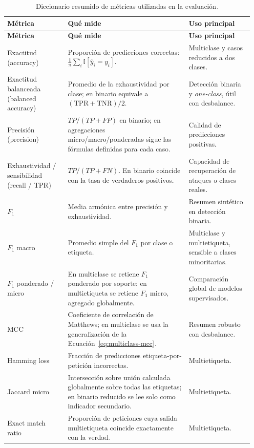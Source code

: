 \documentclass[12pt,oneside]{report}
\newcommand{\ind}{\mathbb{I}} %
\begin{document}
\begin{longtable}{@{}L{0.24\textwidth}L{0.43\textwidth}L{0.25\textwidth}@{}}
\caption{Diccionario resumido de métricas utilizadas en la evaluación.}\label{tab:diccionario-metricas}\\
\toprule
\textbf{Métrica} & \textbf{Qué mide} & \textbf{Uso principal} \\
\midrule
\endfirsthead
\toprule
\textbf{Métrica} & \textbf{Qué mide} & \textbf{Uso principal} \\
\midrule
\endhead
Exactitud (accuracy) & Proporción de predicciones correctas: $\frac{1}{n}\sum_i \ind[\hat y_i=y_i]$. & Multiclase y casos reducidos a dos clases. \\
Exactitud balanceada (balanced accuracy) & Promedio de la exhaustividad por clase; en binario equivale a $(\mathrm{TPR}+\mathrm{TNR})/2$. & Detección binaria y \textit{one-class}, útil con desbalance. \\
Precisión (precision) & $TP/(TP+FP)$ en binario; en agregaciones micro/macro/ponderadas sigue las fórmulas definidas para cada caso. & Calidad de predicciones positivas. \\
Exhaustividad / sensibilidad (recall / TPR) & $TP/(TP+FN)$. En binario coincide con la tasa de verdaderos positivos. & Capacidad de recuperación de ataques o clases reales. \\
$F_1$ & Media armónica entre precisión y exhaustividad. & Resumen sintético en detección binaria. \\
$F_1$ macro & Promedio simple del $F_1$ por clase o etiqueta. & Multiclase y multietiqueta, sensible a clases minoritarias. \\
$F_1$ ponderado / micro & En multiclase se retiene $F_1$ ponderado por soporte; en multietiqueta se retiene $F_1$ micro, agregado globalmente. & Comparación global de modelos supervisados. \\
MCC & Coeficiente de correlación de Matthews; en multiclase se usa la generalización de la Ecuación~\eqref{eq:multiclass-mcc}. & Resumen robusto con desbalance. \\
Hamming loss & Fracción de predicciones etiqueta-por-petición incorrectas. & Multietiqueta. \\
Jaccard micro & Intersección sobre unión calculada globalmente sobre todas las etiquetas; en binario reducido se lee solo como indicador secundario. & Multietiqueta. \\
Exact match ratio & Proporción de peticiones cuya salida multietiqueta coincide exactamente con la verdad. & Multietiqueta. \\

\end{longtable}
\end{document}

